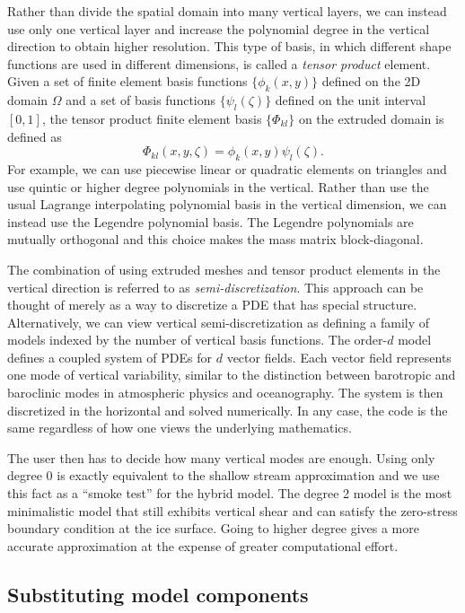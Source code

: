 \documentclass{article}
\theoremstyle{definition}
\theoremstyle{plain}
\begin{document}
Rather than divide the spatial domain into many vertical layers, we can instead use only one vertical layer and increase the polynomial degree in the vertical direction to obtain higher resolution.
This type of basis, in which different shape functions are used in different dimensions, is called a \emph{tensor product} element.
Given a set of finite element basis functions $\{\phi_k(x, y)\}$ defined on the 2D domain $\Omega$ and a set of basis functions $\{\psi_l(\zeta)\}$ defined on the unit interval $[0, 1]$, the tensor product finite element basis $\{\Phi_{kl}\}$ on the extruded domain is defined as
\begin{equation}
    \Phi_{kl}(x, y, \zeta) = \phi_k(x, y)\psi_l(\zeta).
\end{equation}
For example, we can use piecewise linear or quadratic elements on triangles and use quintic or higher degree polynomials in the vertical.
Rather than use the usual Lagrange interpolating polynomial basis in the vertical dimension, we can instead use the Legendre polynomial basis.
The Legendre polynomials are mutually orthogonal and this choice makes the mass matrix block-diagonal.

The combination of using extruded meshes and tensor product elements in the vertical direction is referred to as \emph{semi-discretization}.
This approach can be thought of merely as a way to discretize a PDE that has special structure.
Alternatively, we can view vertical semi-discretization as defining a family of models indexed by the number of vertical basis functions.
The order-$d$ model defines a coupled system of PDEs for $d$ vector fields.
Each vector field represents one mode of vertical variability, similar to the distinction between barotropic and baroclinic modes in atmospheric physics and oceanography.
The system is then discretized in the horizontal and solved numerically.
In any case, the code is the same regardless of how one views the underlying mathematics.

The user then has to decide how many vertical modes are enough.
Using only degree 0 is exactly equivalent to the shallow stream approximation and we use this fact as a ``smoke test'' for the hybrid model.
The degree 2 model is the most minimalistic model that still exhibits vertical shear and can satisfy the zero-stress boundary condition at the ice surface.
Going to higher degree gives a more accurate approximation at the expense of greater computational effort.

\subsection{Substituting model components} \label{sec:physics-substitution}
\end{document}
